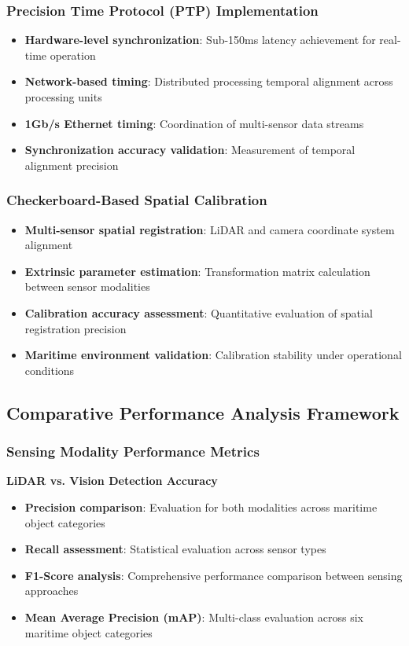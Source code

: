 \documentclass{erauthesis}
\begin{document}
\subsubsection{Precision Time Protocol (PTP) Implementation}
\begin{itemize}
\item \textbf{Hardware-level synchronization}: Sub-150ms latency achievement for real-time operation
\item \textbf{Network-based timing}: Distributed processing temporal alignment across processing units
\item \textbf{1Gb/s Ethernet timing}: Coordination of multi-sensor data streams
\item \textbf{Synchronization accuracy validation}: Measurement of temporal alignment precision
\end{itemize}

\subsubsection{Checkerboard-Based Spatial Calibration}
\begin{itemize}
\item \textbf{Multi-sensor spatial registration}: LiDAR and camera coordinate system alignment
\item \textbf{Extrinsic parameter estimation}: Transformation matrix calculation between sensor modalities
\item \textbf{Calibration accuracy assessment}: Quantitative evaluation of spatial registration precision
\item \textbf{Maritime environment validation}: Calibration stability under operational conditions
\end{itemize}

\subsection{Comparative Performance Analysis Framework}

\subsubsection{Sensing Modality Performance Metrics}

\textbf{LiDAR vs. Vision Detection Accuracy}
\begin{itemize}
\item \textbf{Precision comparison}: Evaluation for both modalities across maritime object categories
\item \textbf{Recall assessment}: Statistical evaluation across sensor types
\item \textbf{F1-Score analysis}: Comprehensive performance comparison between sensing approaches
\item \textbf{Mean Average Precision (mAP)}: Multi-class evaluation across six maritime object categories
\end{itemize}
\end{document}
